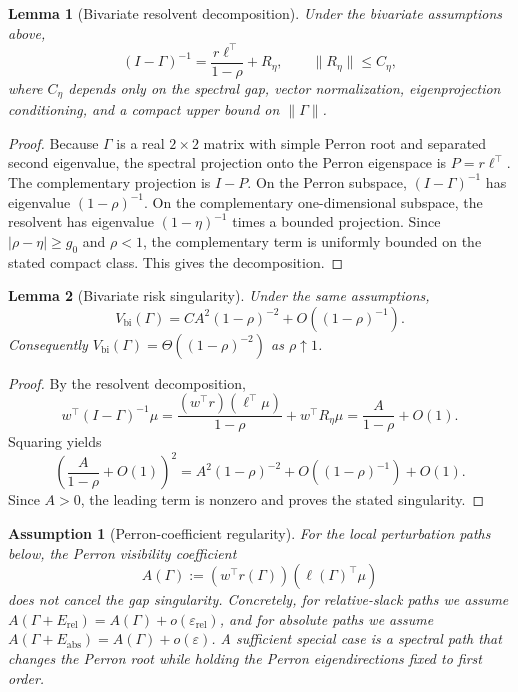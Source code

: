 \documentclass[11pt]{article}
\newtheorem{assumption}{Assumption}
\newtheorem{lemma}{Lemma}
\newcommand{\eps}{\varepsilon}
\begin{document}
\begin{lemma}[Bivariate resolvent decomposition]
Under the bivariate assumptions above,
\[
(I-\Gamma)^{-1}
 =
\frac{r\ell^\top}{1-\rho}
+R_\eta,
\qquad
\|R_\eta\|\le C_\eta,
\]
where $C_\eta$ depends only on the spectral gap, vector normalization,
eigenprojection conditioning, and a compact upper bound on $\|\Gamma\|$.
\end{lemma}

\begin{proof}
Because $\Gamma$ is a real $2\times2$ matrix with simple Perron root and
separated second eigenvalue, the spectral projection onto the Perron eigenspace
is $P=r\ell^\top$. The complementary projection is $I-P$. On the Perron
subspace, $(I-\Gamma)^{-1}$ has eigenvalue $(1-\rho)^{-1}$. On the complementary
one-dimensional subspace, the resolvent has eigenvalue $(1-\eta)^{-1}$ times a
bounded projection. Since $|\rho-\eta|\ge g_0$ and $\rho<1$, the complementary
term is uniformly bounded on the stated compact class. This gives the
decomposition.
\end{proof}

\begin{lemma}[Bivariate risk singularity]
Under the same assumptions,
\[
V_{\mathrm{bi}}(\Gamma)
 =
C A^2(1-\rho)^{-2}
 +O((1-\rho)^{-1}).
\]
Consequently $V_{\mathrm{bi}}(\Gamma)=\Theta((1-\rho)^{-2})$ as
$\rho\uparrow1$.
\end{lemma}

\begin{proof}
By the resolvent decomposition,
\[
w^\top(I-\Gamma)^{-1}\mu
=
\frac{(w^\top r)(\ell^\top\mu)}{1-\rho}
+ w^\top R_\eta \mu
=
\frac{A}{1-\rho}+O(1).
\]
Squaring yields
\[
\left(\frac{A}{1-\rho}+O(1)\right)^2
=
A^2(1-\rho)^{-2}+O((1-\rho)^{-1})+O(1).
\]
Since $A>0$, the leading term is nonzero and proves the stated singularity.
\end{proof}

\begin{assumption}[Perron-coefficient regularity]
For the local perturbation paths below, the Perron visibility coefficient
\[
A(\Gamma):=(w^\top r(\Gamma))(\ell(\Gamma)^\top\mu)
\]
does not cancel the gap singularity. Concretely, for relative-slack paths we
assume $A(\Gamma+E_{\mathrm{rel}})=A(\Gamma)+o(\eps_{\mathrm{rel}})$, and for
absolute paths we assume $A(\Gamma+E_{\mathrm{abs}})=A(\Gamma)+o(\eps)$. A
sufficient special case is a spectral path that changes the Perron root while
holding the Perron eigendirections fixed to first order.
\end{assumption}
\end{document}
